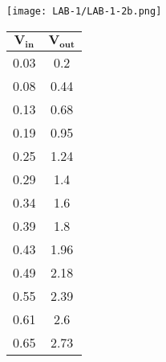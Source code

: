 \documentclass[12pt]{article}
\begin{document}
   \begin{figure}[H]
    \begin{subfigure}{0.7\linewidth}
      \centering
      \texttt{[image: LAB-1/LAB-1-2b.png]}
    \end{subfigure} 
    \begin{subfigure}{0.2\linewidth}
      \centering
      \begin{tabular}{|c|c|}
       \hline
       \bfseries $\mathbf{V_{in}}$	& \bfseries	$\mathbf{V_{out}}$	\\
       \hline
            0.03 &	0.2\\
            0.08 &	0.44\\
            0.13 &	0.68\\
            0.19 &	0.95\\
            0.25 &	1.24\\
            0.29 &	1.4\\
            0.34 &	1.6\\
            0.39 &	1.8\\
            0.43 &	1.96\\
            0.49 &	2.18\\
            0.55 &	2.39\\
            0.61 &	2.6\\
            0.65 &	2.73\\

           \hline
      \end{tabular}
    \end{subfigure} 
   \end{figure}
   
\end{document}
